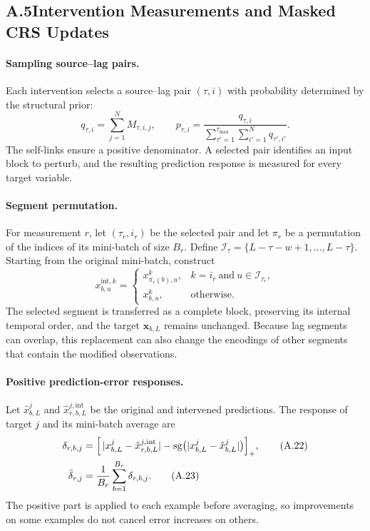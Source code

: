 \documentclass[letterpaper]{article}
\begin{document}
\subsection{A.5\quad Intervention Measurements and Masked CRS Updates}

\paragraph{Sampling source--lag pairs.}
Each intervention selects a source--lag pair $(\tau,i)$ with probability determined by the structural prior:
\begin{equation}
q_{\tau,i}=\sum_{j=1}^{N}M_{\tau,i,j},\qquad p_{\tau,i}=\frac{q_{\tau,i}}{\sum_{\tau'=1}^{\tau_{\max}}\sum_{i'=1}^{N}q_{\tau',i'}}.
\tag{A.20}
\end{equation}
The self-links ensure a positive denominator. A selected pair identifies an input block to perturb, and the resulting prediction response is measured for every target variable.

\paragraph{Segment permutation.}
For measurement $r$, let $(\tau_r,i_r)$ be the selected pair and let $\pi_r$ be a permutation of the indices of its mini-batch of size $B_r$. Define $\mathcal{I}_\tau=\{L-\tau-w+1,\ldots,L-\tau\}$. Starting from the original mini-batch, construct
\begin{equation}
x^{\mathrm{int},k}_{b,u}=
\begin{cases}
x^k_{\pi_r(b),u}, & k=i_r\ \text{and}\ u\in\mathcal{I}_{\tau_r},\\
x^k_{b,u}, & \text{otherwise}.
\end{cases}
\tag{A.21}
\end{equation}
The selected segment is transferred as a complete block, preserving its internal temporal order, and the target $\mathbf{x}_{b,L}$ remains unchanged. Because lag segments can overlap, this replacement can also change the encodings of other segments that contain the modified observations.

\paragraph{Positive prediction-error responses.}
Let $\hat{x}^j_{b,L}$ and $\hat{x}^{j,\mathrm{int}}_{r,b,L}$ be the original and intervened predictions. The response of target $j$ and its mini-batch average are
\begin{align}
\delta_{r,b,j}&=\Bigl[\,|x^j_{b,L}-\hat{x}^{j,\mathrm{int}}_{r,b,L}|-\mathrm{sg}\bigl(|x^j_{b,L}-\hat{x}^j_{b,L}|\bigr)\Bigr]_+, \tag{A.22}\\
\bar{\delta}_{r,j}&=\frac{1}{B_r}\sum_{b=1}^{B_r}\delta_{r,b,j}. \tag{A.23}
\end{align}
The positive part is applied to each example before averaging, so improvements on some examples do not cancel error increases on others.
\end{document}
